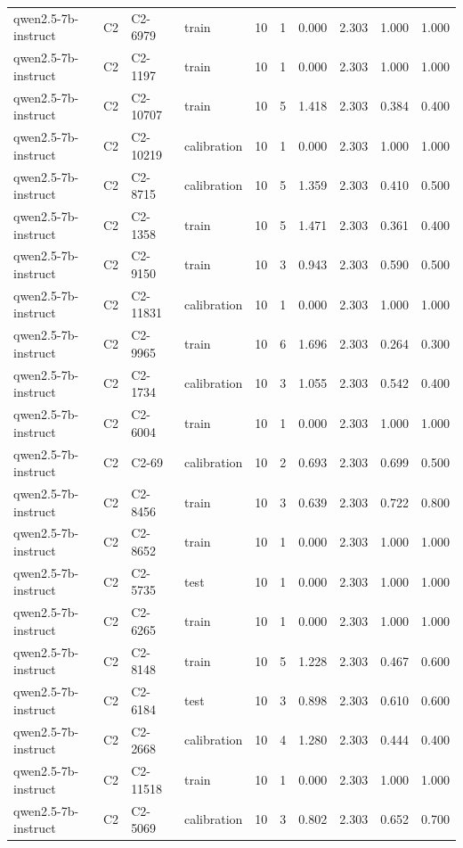 \begin{table}
\begin{tabular}{llllrrrrrr}
qwen2.5-7b-instruct & C2 & C2-6979 & train & 10 & 1 & 0.000 & 2.303 & 1.000 & 1.000 \\
qwen2.5-7b-instruct & C2 & C2-1197 & train & 10 & 1 & 0.000 & 2.303 & 1.000 & 1.000 \\
qwen2.5-7b-instruct & C2 & C2-10707 & train & 10 & 5 & 1.418 & 2.303 & 0.384 & 0.400 \\
qwen2.5-7b-instruct & C2 & C2-10219 & calibration & 10 & 1 & 0.000 & 2.303 & 1.000 & 1.000 \\
qwen2.5-7b-instruct & C2 & C2-8715 & calibration & 10 & 5 & 1.359 & 2.303 & 0.410 & 0.500 \\
qwen2.5-7b-instruct & C2 & C2-1358 & train & 10 & 5 & 1.471 & 2.303 & 0.361 & 0.400 \\
qwen2.5-7b-instruct & C2 & C2-9150 & train & 10 & 3 & 0.943 & 2.303 & 0.590 & 0.500 \\
qwen2.5-7b-instruct & C2 & C2-11831 & calibration & 10 & 1 & 0.000 & 2.303 & 1.000 & 1.000 \\
qwen2.5-7b-instruct & C2 & C2-9965 & train & 10 & 6 & 1.696 & 2.303 & 0.264 & 0.300 \\
qwen2.5-7b-instruct & C2 & C2-1734 & calibration & 10 & 3 & 1.055 & 2.303 & 0.542 & 0.400 \\
qwen2.5-7b-instruct & C2 & C2-6004 & train & 10 & 1 & 0.000 & 2.303 & 1.000 & 1.000 \\
qwen2.5-7b-instruct & C2 & C2-69 & calibration & 10 & 2 & 0.693 & 2.303 & 0.699 & 0.500 \\
qwen2.5-7b-instruct & C2 & C2-8456 & train & 10 & 3 & 0.639 & 2.303 & 0.722 & 0.800 \\
qwen2.5-7b-instruct & C2 & C2-8652 & train & 10 & 1 & 0.000 & 2.303 & 1.000 & 1.000 \\
qwen2.5-7b-instruct & C2 & C2-5735 & test & 10 & 1 & 0.000 & 2.303 & 1.000 & 1.000 \\
qwen2.5-7b-instruct & C2 & C2-6265 & train & 10 & 1 & 0.000 & 2.303 & 1.000 & 1.000 \\
qwen2.5-7b-instruct & C2 & C2-8148 & train & 10 & 5 & 1.228 & 2.303 & 0.467 & 0.600 \\
qwen2.5-7b-instruct & C2 & C2-6184 & test & 10 & 3 & 0.898 & 2.303 & 0.610 & 0.600 \\
qwen2.5-7b-instruct & C2 & C2-2668 & calibration & 10 & 4 & 1.280 & 2.303 & 0.444 & 0.400 \\
qwen2.5-7b-instruct & C2 & C2-11518 & train & 10 & 1 & 0.000 & 2.303 & 1.000 & 1.000 \\
qwen2.5-7b-instruct & C2 & C2-5069 & calibration & 10 & 3 & 0.802 & 2.303 & 0.652 & 0.700 \\

\end{tabular}
\end{table}
